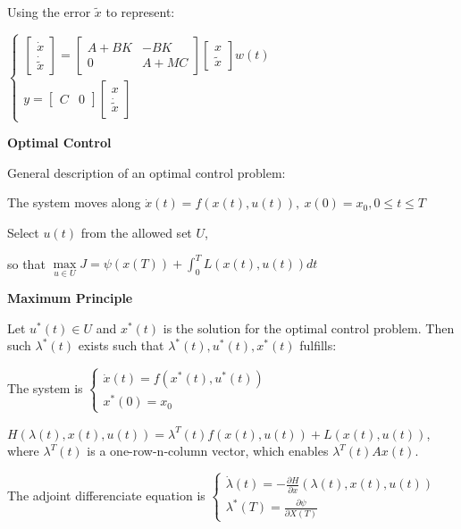 \documentclass{article}
\newcommand{\bigtitle}[1]{
	\noindent
	\textbf{#1}
}
\begin{document}
\begin{spacing}{1.2}
Using the error $\tilde{x}$ to represent:

$
\left\{
\begin{array}{l}
\left[ \begin{array}{c}{\dot{x}} \\ {\dot{\tilde{x}}}\end{array}\right]=\left[ \begin{array}{cc}{A+B K} & {-B K} \\ {0} & {A+M C}\end{array}\right] \left[ \begin{array}{l}{x} \\ {\widetilde{x}}\end{array}\right] w(t)
\\
y=\left[ \begin{array}{ll}{C} & {0}\end{array}\right] \left[ \begin{array}{l}{x} \\ {\dot{\widetilde{x}}}\end{array}\right]
\end{array}
\right.
$


\bigtitle{Optimal Control}

General description of an optimal control problem:

The system moves along $\dot{x}(t)=f(x(t), u(t)),\  x(0)=x_{0}, 0 \leq t \leq T$

Select $u(t)$ from the allowed set $U$,

so that $\max \limits_{u \in U} J=\psi(x(T))+\int_{0}^{T} L(x(t), u(t)) d t$

\bigtitle{Maximum Principle}

Let $u^*(t) \in U$ and $x^*(t)$ is the solution for the optimal control problem. Then such $\lambda^*(t)$ exists such that $\lambda^*(t), u^*(t), x^*(t)$ fulfills:

The system is $\left\{\begin{array}{c}{\dot{x}(t)=f\left(x^{*}(t), u^{*}(t)\right)} \\ {x^{*}(0)=x_{0}}\end{array}\right.$

$H(\lambda(t), x(t), u(t))=\lambda^{T}(t) f(x(t), u(t))+L(x(t), u(t))$, where $\lambda^T(t)$ is a one-row-n-column vector, which enables $\lambda^T(t) A x(t)$.

The adjoint differenciate equation is $\left\{\begin{array}{c}{\dot{\lambda}(t)=-\frac{\partial H}{\partial x}(\lambda(t), x(t), u(t))} \\ {\lambda^{*}(T)=\frac{\partial \psi}{\partial X(T)}}\end{array}\right.$


\end{spacing}
\end{document}
